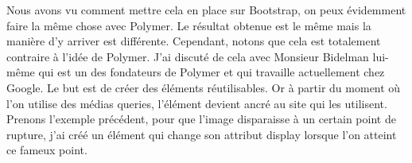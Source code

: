 \documentclass{article}
\begin{document}
Nous avons vu comment mettre cela en place sur Bootstrap, on peux \'evidemment faire la m\^eme chose avec Polymer. Le r\'esultat obtenue est le m\^eme mais la mani\`ere d'y arriver est diff\'erente. Cependant, notons que cela est totalement contraire \`a l'id\'ee de Polymer. J'ai discut\'e de cela avec Monsieur Bidelman lui-m\^eme qui est un des fondateurs de Polymer et qui travaille actuellement chez Google. Le but est de cr\'eer des \'el\'ements r\'eutilisables. Or \`a partir du moment o\`u l'on utilise des m\'edias queries, l'\'el\'ement devient ancr\'e au site qui les utilisent. Prenons l'exemple pr\'ec\'edent, pour que l'image disparaisse \`a un certain point de rupture, j'ai cr\'e\'e un \'el\'ement qui change son attribut \og display \fg{} lorsque l'on atteint ce fameux point.
\vspace{0.5cm}\\
\end{document}
